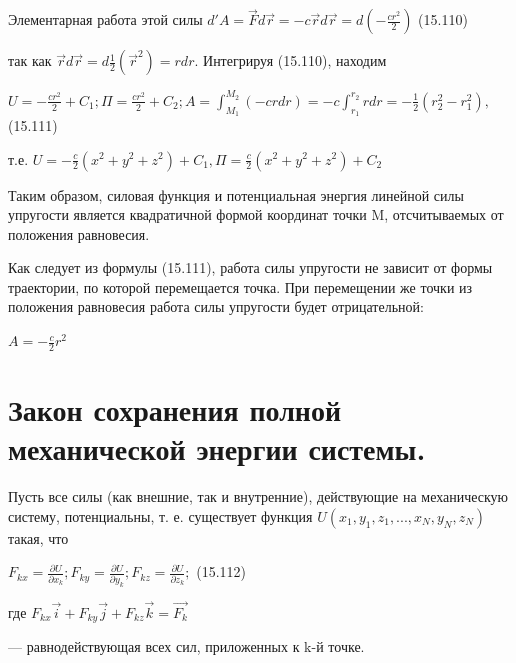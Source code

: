 {\begin{center}
    \par Элементарная работа этой силы $ d'A =\vec{F} d\vec{r} = -c\vec{r}d\vec{r} = d(-\frac{cr^{2}}{2})$  \qquad (15.110)
    
    \par так как $\vec{r}d\vec{r} = d \frac{1}{2}(\vec{r}^{2}) = rdr.$ Интегрируя (15.110), находим 

    \par $U = -\frac{cr^{2}}{2} + C_{1}; \Pi = \frac{cr^{2}}{2} + C_{2}; A = \int_{M_{1}}^{M_{2}}(-crdr)=-c\int_{r_{1}}^{r_{2}}rdr = -\frac{1}{2}(r_{2}^{2} - r_{1}^{2}),$  \qquad (15.111)

    \par т.е. $ U = -\frac{c}{2}(x^{2} + y^{2} +z^{2}) +C_{1}, \Pi = \frac{c}{2}(x^{2} + y^{2} +z^{2}) +C_{2}$

    \par Таким  образом,  силовая  функция  и  потенциальная  энергия  линейной  силы упругости является квадратичной формой координат точки M, отсчитываемых от положения равновесия.
    \par Как следует из  формулы (15.111),  работа  силы упругости не  зависит от формы траектории,  по которой перемещается  точка. При  перемещении же точки из положения равновесия работа силы упругости будет отрицательной:
    \par $ A=-\frac{c}{2}r^{2}$
    
    
\end{center}
\section{Закон сохранения полной механической энергии системы.}
\begin{center}
    \par Пусть все силы (как внешние, так и внутренние), действующие на механическую систему, потенциальны, т. е. существует функция $U(x_{1}, y_{1},z_{1},...,x_{N},y_{N},z_{N})$ такая, что   

    \par $ F_{kx} = \frac{\partial U}{\partial x_{k}}; F_{ky} = \frac{\partial U}{\partial y_{k}}; F_{kz} = \frac{\partial U}{\partial z_{k}}; $ \qquad (15.112)

    \par где $F_{kx}\vec{i} + F_{ky}\vec{j} + F_{kz}\vec{k} = \vec{F_{k}}$ 

    \par — равнодействующая всех сил, приложенных к k-й точке.


\end{center}}
